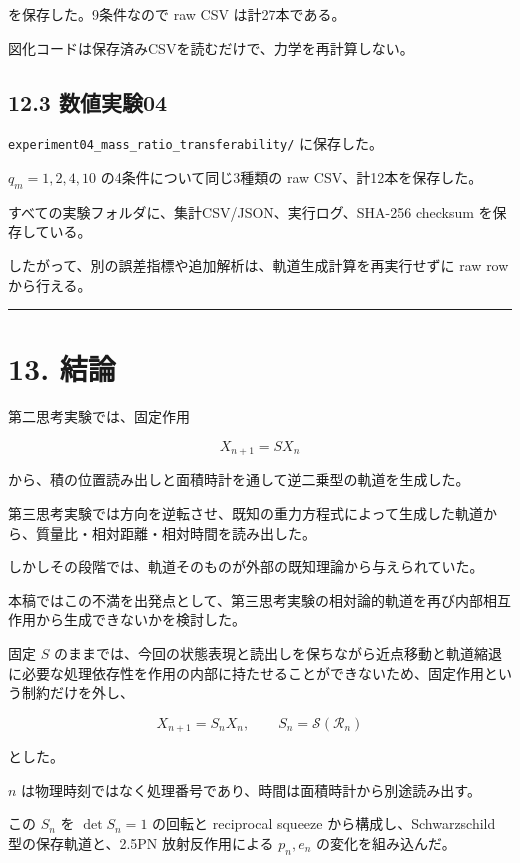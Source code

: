 \documentclass[
  a4paper,
]{ltjsarticle}
\begin{document}
を保存した。9条件なので raw CSV は計27本である。

図化コードは保存済みCSVを読むだけで、力学を再計算しない。

\subsection{12.3 数値実験04}\label{ux6570ux5024ux5b9fux9a1304}

\texttt{experiment04\_mass\_ratio\_transferability/} に保存した。

\(q_m=1,2,4,10\) の4条件について同じ3種類の raw CSV、計12本を保存した。

すべての実験フォルダに、集計CSV/JSON、実行ログ、SHA-256 checksum
を保存している。

したがって、別の誤差指標や追加解析は、軌道生成計算を再実行せずに raw row
から行える。

\begin{center}\rule{0.5\linewidth}{0.5pt}\end{center}

\section{13. 結論}\label{ux7d50ux8ad6}

第二思考実験では、固定作用

\[
X_{n+1}=SX_n
\]

から、積の位置読み出しと面積時計を通して逆二乗型の軌道を生成した。

第三思考実験では方向を逆転させ、既知の重力方程式によって生成した軌道から、質量比・相対距離・相対時間を読み出した。

しかしその段階では、軌道そのものが外部の既知理論から与えられていた。

本稿ではこの不満を出発点として、第三思考実験の相対論的軌道を再び内部相互作用から生成できないかを検討した。

固定 \(S\)
のままでは、今回の状態表現と読出しを保ちながら近点移動と軌道縮退に必要な処理依存性を作用の内部に持たせることができないため、固定作用という制約だけを外し、

\[
\boxed{
X_{n+1}=S_nX_n,
\qquad
S_n=\mathcal S(\mathcal R_n)
}
\]

とした。

\(n\) は物理時刻ではなく処理番号であり、時間は面積時計から別途読み出す。

この \(S_n\) を \(\det S_n=1\) の回転と reciprocal squeeze
から構成し、Schwarzschild 型の保存軌道と、2.5PN 放射反作用による
\(p_n,e_n\) の変化を組み込んだ。
\end{document}
